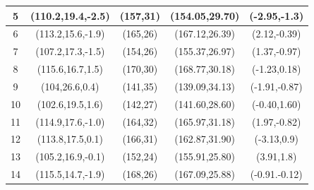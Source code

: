 \begin{table}[H]
\begin{tabular}{|c|c|c|c|c|}
5     & (110.2,19.4,-2.5) & (157,31)                                                          & (154.05,29.70)                                                    & (-2.95,-1.3)                                                  \\ \hline
6     & (113.2,15.6,-1.9) & (165,26)                                                          & (167.12,26.39)                                                    & (2.12,-0.39)                                                  \\ \hline
7     & (107.2,17.3,-1.5) & (154,26)                                                          & (155.37,26.97)                                                    & (1.37,-0.97)                                                  \\ \hline
8     & (115.6,16.7,1.5)  & (170,30)                                                          & (168.77,30.18)                                                    & (-1.23,0.18)                                                  \\ \hline
9     & (104,26.6,0.4)    & (141,35)                                                          & (139.09,34.13)                                                    & (-1.91,-0.87)                                                 \\ \hline
10    & (102.6,19.5,1.6)  & (142,27)                                                          & (141.60,28.60)                                                    & (-0.40,1.60)                                                  \\ \hline
11    & (114.9,17.6,-1.0) & (164,32)                                                          & (165.97,31.18)                                                    & (1.97,-0.82)                                                  \\ \hline
12    & (113.8,17.5,0.1)  & (166,31)                                                          & (162.87,31.90)                                                    & (-3.13,0.9)                                                   \\ \hline
13    & (105.2,16.9,-0.1) & (152,24)                                                          & (155.91,25.80)                                                    & (3.91,1.8)                                                    \\ \hline
14    & (115.5,14.7,-1.9) & (168,26)                                                          & (167.09,25.88)                                                    & (-0.91.-0.12)                                                 \\ \hline

\end{tabular}
\end{table}
